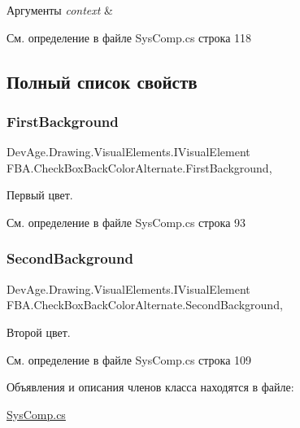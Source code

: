\begin{DoxyParams}{Аргументы}
{\em context} & \\
\hline
\end{DoxyParams}


См. определение в файле Sys\+Comp.\+cs строка 118



\subsection{Полный список свойств}
\mbox{\label{class_f_b_a_1_1_check_box_back_color_alternate_a495d850ff491c88c99a2b7874a9ddef0}} 
\subsubsection{\texorpdfstring{First\+Background}{FirstBackground}}
{\footnotesize\ttfamily Dev\+Age.\+Drawing.\+Visual\+Elements.\+I\+Visual\+Element F\+B\+A.\+Check\+Box\+Back\+Color\+Alternate.\+First\+Background\hspace{0.3cm}{\ttfamily [get]}, {\ttfamily [set]}}



Первый цвет. 



См. определение в файле Sys\+Comp.\+cs строка 93

\mbox{\label{class_f_b_a_1_1_check_box_back_color_alternate_a09a47acdc2b2db05505324e076cc7973}} 
\subsubsection{\texorpdfstring{Second\+Background}{SecondBackground}}
{\footnotesize\ttfamily Dev\+Age.\+Drawing.\+Visual\+Elements.\+I\+Visual\+Element F\+B\+A.\+Check\+Box\+Back\+Color\+Alternate.\+Second\+Background\hspace{0.3cm}{\ttfamily [get]}, {\ttfamily [set]}}



Второй цвет. 



См. определение в файле Sys\+Comp.\+cs строка 109



Объявления и описания членов класса находятся в файле\+:\begin{DoxyCompactItemize}
\item 
\mbox{\hyperlink{_sys_comp_8cs}{Sys\+Comp.\+cs}}\end{DoxyCompactItemize}
